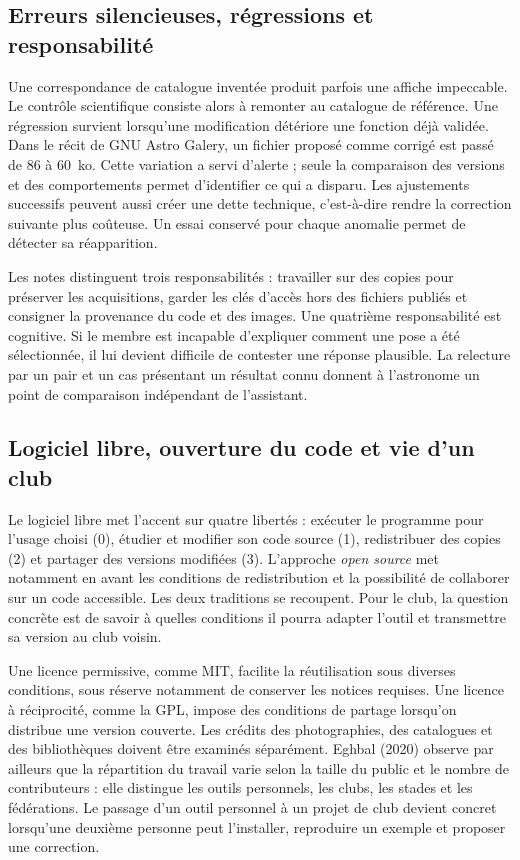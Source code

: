 \subsection{Erreurs silencieuses, régressions et responsabilité}
Une correspondance de catalogue inventée produit parfois une affiche impeccable. Le contrôle scientifique consiste alors à remonter au catalogue de référence. Une régression survient lorsqu'une modification détériore une fonction déjà validée. Dans le récit de GNU Astro Galery, un fichier proposé comme corrigé est passé de 86 à 60~ko. Cette variation a servi d'alerte ; seule la comparaison des versions et des comportements permet d'identifier ce qui a disparu. Les ajustements successifs peuvent aussi créer une dette technique, c'est-à-dire rendre la correction suivante plus coûteuse. Un essai conservé pour chaque anomalie permet de détecter sa réapparition.

Les notes distinguent trois responsabilités : travailler sur des copies pour préserver les acquisitions, garder les clés d'accès hors des fichiers publiés et consigner la provenance du code et des images. Une quatrième responsabilité est cognitive. Si le membre est incapable d'expliquer comment une pose a été sélectionnée, il lui devient difficile de contester une réponse plausible. La relecture par un pair et un cas présentant un résultat connu donnent à l'astronome un point de comparaison indépendant de l'assistant.

\subsection{Logiciel libre, ouverture du code et vie d'un club}
Le logiciel libre met l'accent sur quatre libertés : exécuter le programme pour l'usage choisi (0), étudier et modifier son code source (1), redistribuer des copies (2) et partager des versions modifiées (3). L'approche \emph{open source} met notamment en avant les conditions de redistribution et la possibilité de collaborer sur un code accessible. Les deux traditions se recoupent. Pour le club, la question concrète est de savoir à quelles conditions il pourra adapter l'outil et transmettre sa version au club voisin.

Une licence permissive, comme MIT, facilite la réutilisation sous diverses conditions, sous réserve notamment de conserver les notices requises. Une licence à réciprocité, comme la GPL, impose des conditions de partage lorsqu'on distribue une version couverte. Les crédits des photographies, des catalogues et des bibliothèques doivent être examinés séparément. Eghbal (2020) observe par ailleurs que la répartition du travail varie selon la taille du public et le nombre de contributeurs : elle distingue les outils personnels, les clubs, les stades et les fédérations. Le passage d'un outil personnel à un projet de club devient concret lorsqu'une deuxième personne peut l'installer, reproduire un exemple et proposer une correction.

